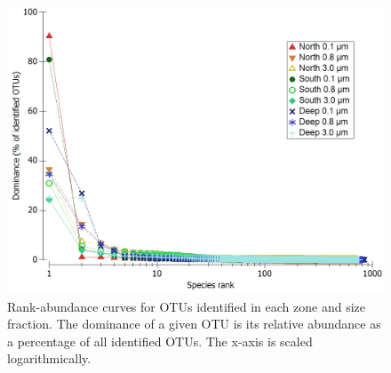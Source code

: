 \begin{figure}
  \centering
  \includegraphics[width=\textwidth]{../polarfront/rankabundance.png}
  \caption[Rank-abundance curves for OTUs in each zone and size fraction]{Rank-abundance curves for OTUs identified in each zone and size fraction. The dominance of a given OTU is its relative abundance as a percentage of all identified OTUs. The x-axis is scaled logarithmically.}
  \label{fig:rankabundance}
\end{figure}
